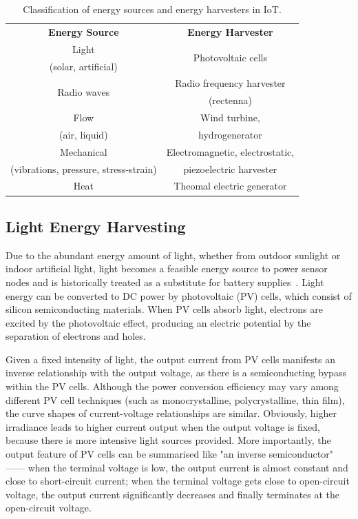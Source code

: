 \begin{table}
    \renewcommand{\arraystretch}{1.2}
    \centering
    \begin{tabular}{|c|c|}
    \hline
    \multirow{2}{*}{\textbf{Energy Source}} & \multirow{2}{*}{\textbf{Energy Harvester}} \\
    & \\ 
    \hline
    Light & \multirow{2}{*}{Photovoltaic cells} \\
    (solar, artificial) & \\ 
    \hline
    \multirow{2}{*}{Radio waves} & Radio frequency harvester \\ 
    & (rectenna) \\ 
    \hline
    Flow & Wind turbine, \\ 
    (air, liquid) & hydrogenerator \\ 
    \hline
    Mechanical & Electromagnetic, electrostatic, \\ 
    (vibrations, pressure, stress-strain) & piezoelectric harvester \\ 
    \hline
    \multirow{2}{*}{Heat} & \multirow{2}{*}{Theomal electric generator} \\
    & \\  
    \hline
    \end{tabular}
    \caption{Classification of energy sources and energy harvesters in IoT.}
    \label{tab:energysources}
\end{table}

\subsection{Light Energy Harvesting}

Due to the abundant energy amount of light, whether from outdoor sunlight or indoor artificial light, light becomes a feasible energy source to power sensor nodes and is historically treated as a substitute for battery supplies~\cite{raghunathan2005design, seah2009wireless}. 
Light energy can be converted to DC power by photovoltaic (PV) cells, which consist of silicon semiconducting materials. 
When PV cells absorb light, electrons are excited by the photovoltaic effect, producing an electric potential by the separation of electrons and holes.

Given a fixed intensity of light, the output current from PV cells manifests an inverse relationship with the output voltage, as there is a semiconducting bypass within the PV cells. Although the power conversion efficiency may vary among different PV cell techniques (such as monocrystalline, polycrystalline, thin film), the curve shapes of current-voltage relationships are similar. Obviously, higher irradiance leads to higher current output when the output voltage is fixed, because there is more intensive light sources provided. More importantly, the output feature of PV cells can be summarised like "an inverse semiconductor" ------ when the terminal voltage is low, the output current is almost constant and close to short-circuit current; when the terminal voltage gets close to open-circuit voltage, the output current significantly decreases and finally terminates at the open-circuit voltage. 

